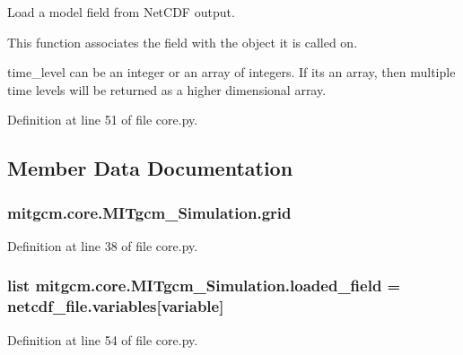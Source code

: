Load a model field from Net\+C\+D\+F output. 

This function associates the field with the object it is called on.

time\+\_\+level can be an integer or an array of integers. If it\textquotesingle{}s an array, then multiple time levels will be returned as a higher dimensional array. 

Definition at line 51 of file core.\+py.



\subsection{Member Data Documentation}
\hypertarget{classmitgcm_1_1core_1_1MITgcm__Simulation_a984db65a189bf843e988079f724cdee3}{}
\subsubsection[{grid}]{\setlength{\rightskip}{0pt plus 5cm}mitgcm.\+core.\+M\+I\+Tgcm\+\_\+\+Simulation.\+grid}\label{classmitgcm_1_1core_1_1MITgcm__Simulation_a984db65a189bf843e988079f724cdee3}


Definition at line 38 of file core.\+py.

\hypertarget{classmitgcm_1_1core_1_1MITgcm__Simulation_ad50484938272dfc5107b0af495443d25}{}
\subsubsection[{loaded\+\_\+field}]{\setlength{\rightskip}{0pt plus 5cm}list mitgcm.\+core.\+M\+I\+Tgcm\+\_\+\+Simulation.\+loaded\+\_\+field = netcdf\+\_\+file.\+variables\mbox{[}variable\mbox{]}\hspace{0.3cm}{\ttfamily [static]}}\label{classmitgcm_1_1core_1_1MITgcm__Simulation_ad50484938272dfc5107b0af495443d25}


Definition at line 54 of file core.\+py.

\hypertarget{classmitgcm_1_1core_1_1MITgcm__Simulation_a801f2b7847cdd50c031f6f566e263189}{}
